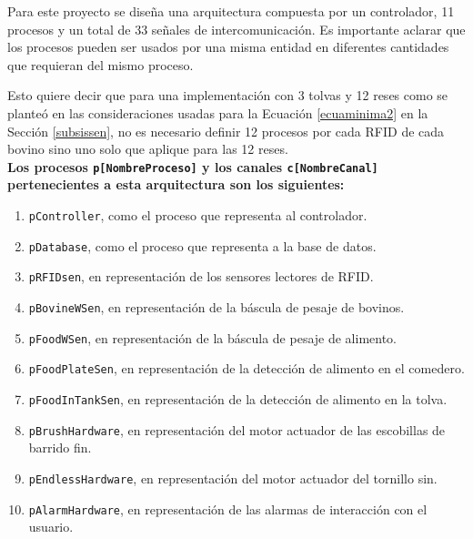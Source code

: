 Para este proyecto se diseña una arquitectura compuesta por un controlador, 11 procesos y un total de 33 señales de intercomunicación. Es importante aclarar que los procesos pueden ser usados por una misma entidad en diferentes cantidades que requieran del mismo proceso.

Esto quiere decir que para una implementación con 3 tolvas y 12 reses como se planteó en las consideraciones usadas para la Ecuación \ref{ecuaminima2} en la Sección \ref{subsissen}, no es necesario definir 12 procesos por cada RFID de cada bovino sino uno solo que aplique para las 12 reses. \\

\textbf{Los procesos \texttt{p[NombreProceso]} y los canales \texttt{c[NombreCanal]} pertenecientes a esta arquitectura son los siguientes:}
\begin{enumerate}
    \item \texttt{pController}, como el proceso que representa al controlador.
    \item \texttt{pDatabase}, como el proceso que representa a la base de datos.
    \item \texttt{pRFIDsen}, en representación de los sensores lectores de RFID.
    \item \texttt{pBovineWSen}, en representación de la báscula de pesaje de bovinos.
    \item \texttt{pFoodWSen}, en representación de la báscula de pesaje de alimento.
    \item \texttt{pFoodPlateSen}, en representación de la detección de alimento en el comedero.
    \item \texttt{pFoodInTankSen}, en representación de la detección de alimento en la tolva.
    \item \texttt{pBrushHardware}, en representación del motor actuador de las escobillas de barrido fin.
    \item \texttt{pEndlessHardware}, en representación del motor actuador del tornillo sin.
    \item \texttt{pAlarmHardware}, en representación de las alarmas de interacción con el usuario.



\end{enumerate}

